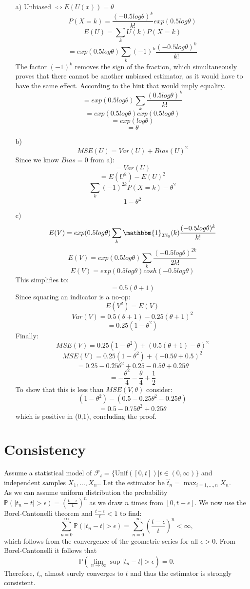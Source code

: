 \documentclass[10pt]{article}
\numberwithin{equation}{section}
\begin{document}
\begin{enumerate}
\item[a)]{
    Unbiased $\Leftrightarrow E(U(x)) = \theta$
    $$P(X=k) = \frac{(-0.5 log \theta)^k}{k!} exp(0.5 log \theta)$$
    $$E(U) = \sum_k U(k)P(X=k)$$
    $$ = exp(0.5 log \theta) \sum_k (-1)^k \frac{(-0.5 log \theta)^k}{k!}$$
    The factor $(-1)^k$ removes the sign of the fraction, which simultaneously proves that there cannot be another unbiased estimator, as it would have to have the same effect. According to the hint that would imply equality.
    $$ = exp(0.5 log \theta) \sum_k \frac{(0.5 log \theta)^k}{k!}$$
    $$ = exp(0.5 log \theta) exp(0.5 log \theta) $$
    $$ = exp(log \theta)$$
    $$ = \theta$$
}
\item[b)]{
    $$ MSE(U) = Var(U) + Bias(U)^2$$
    Since we know $Bias = 0$ from a):
    $$= Var(U)$$
    $$= E(U^2) - E(U)^2$$
    $$\sum_k (-1)^{2k} P(X=k) - \theta^2$$
    $$ 1 - \theta^2$$
}
\item[c)]{
    $$E(V) = exp(0.5log\theta) \sum_k \mathbbm{1}_{2\mathbb{N}_0}(k) \frac{(-0.5log\theta)^k}{k!}$$
    $$E(V) = exp(0.5log\theta) \sum_k \frac{(-0.5log\theta)^{2k}}{2k!}$$
    $$E(V) = exp(0.5log\theta) cosh(-0.5log\theta)$$
    This simplifies to:
    $$= 0.5(\theta + 1)$$
    Since squaring an indicator is a no-op:
    $$E(V^2) = E(V)$$
    $$Var(V) = 0.5(\theta +1) - 0.25(\theta+1)^2$$
    $$= 0.25(1-\theta^2)$$
    Finally:
    $$MSE(V) = 0.25(1-\theta^2) + (0.5(\theta + 1) - \theta)^2$$
    $$MSE(V) = 0.25(1-\theta^2) + (-0.5\theta + 0.5)^2$$
    $$= 0.25-0.25\theta^2 + 0.25-0.5\theta+0.25\theta$$
    $$= -\frac{\theta^2}{4} - \frac{\theta}{4} + \frac{1}{2}$$
    To show that this is less than $MSE(V, \theta)$ consider:
    $$(1-\theta^2) - (0.5-0.25\theta^2-0.25\theta)$$
    $$= 0.5 - 0.75\theta^2 + 0.25\theta$$
    which is positive in (0,1), concluding the proof.
}
\end{enumerate}

\section*{Consistency}
\begin{enumerate}
Assume a statistical model of $\mathcal{F}_t = \{\text{Unif}([0, t])|t \in (0, \infty)\}$ and independent samples $X_1, ..., X_n.$. 
Let the estimator be $\hat{t}_n = \max_{i=1, ..., n}X_n$. 
\\
As we can assume uniform distribution the probability $\mathbb{P} (|t_n-t|> \epsilon) = (\frac{t-\epsilon}{t})^n$ as we draw $n$ times from $[0, t-\epsilon]$. We now use the Borel-Cantonelli theorem and $\frac{t-\epsilon}{t}<1$ to find:
$$
\sum_{n=0}^\infty \mathbb{P}(|t_n-t|> \epsilon) = \sum_{n=0}^\infty \left(\frac{t-\epsilon}{t}\right)^n < \infty,
$$ which follows from the convergence of the geometric series for all $\epsilon > 0$. 
From Borel-Cantonelli it follows that 
$$
\mathbb{P} (\lim_{n \to \infty} \sup |t_n-t|> \epsilon) = 0.
$$
Therefore, $t_n$ almost surely converges to $t$ and thus the estimator is strongly consistent. 
\end{enumerate}
\end{document}
